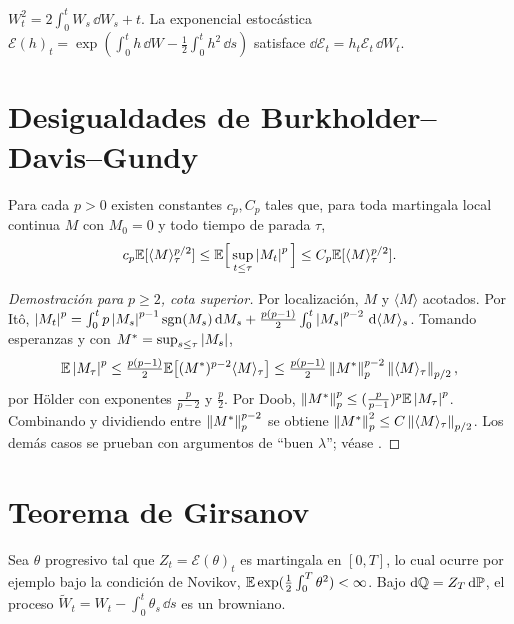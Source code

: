 \begin{ejemplo}
$W_t^2=2\int_0^tW_s\,\dd W_s+t$. La exponencial estocástica $\mathcal E(h)_t=\exp(\int_0^th\,\dd W-
\frac12\int_0^th^2\,\dd s)$ satisface $\dd\mathcal E_t=h_t\mathcal E_t\,\dd W_t$.
\end{ejemplo}

\section{Desigualdades de Burkholder--Davis--Gundy}

\begin{teorema}[BDG]\label{teo:bdg}
Para cada $p>0$ existen constantes $c_p,C_p$ tales que, para toda
martingala local continua $M$ con $M_0=0$ y todo tiempo de parada $\tau$,
\[
  c_p\mathbb{E}[\langle M\rangle_\tau^{p/2}]\le\mathbb{E}\Big[\sup_{t\le\tau}\left\lvert M_t\right\rvert^p\Big]\le C_p\mathbb{E}[\langle M\rangle_\tau^{p/2}].
\]
\end{teorema}

\begin{proof}[Demostración para $p\ge2$, cota superior]
Por localización, $M$ y $\langle M\rangle$ acotados. Por Itô,
$\left\lvert M_t\right\rvert^p=\int_0^tp\left\lvert M_s\right\rvert^{p-1}\operatorname{sgn}(M_s)\,\mathrm{d} M_s+\frac{p(p-1)}{2}\int_0^t\left\lvert M_s\right\rvert^{p-2}\,\mathrm{d}\langle M\rangle_s$. Tomando esperanzas y con
$M^*=\sup_{s\le\tau}\left\lvert M_s\right\rvert$,
\[
  \mathbb{E}\left\lvert M_\tau\right\rvert^p\le\tfrac{p(p-1)}{2}\mathbb{E}\big[(M^*)^{p-2}\langle M\rangle_\tau\big]\le\tfrac{p(p-1)}{2}\left\lVert M^*\right\rVert_p^{p-2}\left\lVert \langle M\rangle_\tau\right\rVert_{p/2},
\]
por Hölder con exponentes $\frac{p}{p-2}$ y $\frac p2$. Por Doob, $\left\lVert M^*\right\rVert_p^p\le(\frac{p}{p-1})^p\mathbb{E}\left\lvert M_\tau\right\rvert^p$. Combinando y
dividiendo entre $\left\lVert M^*\right\rVert_p^{p-2}$ se obtiene $\left\lVert M^*\right\rVert_p^2\le C\left\lVert \langle M\rangle_\tau\right\rVert_{p/2}$. Los demás casos se prueban con
argumentos de ``buen $\lambda$''; véase \cite[Th.~IV.4.1]{RevuzYor99}.
\end{proof}

\section{Teorema de Girsanov}

\begin{teorema}[Girsanov]\label{teo:girsanov}
Sea $\theta$ progresivo tal que $Z_t=\mathcal E(\theta)_t$ es martingala en $[0,T]$, lo cual
ocurre por ejemplo bajo la condición de Novikov, $\mathbb{E}\exp(\frac12\int_0^T\theta^2)<\infty$. Bajo $\mathrm{d}\mathbb{Q}=Z_T\,\mathrm{d}\mathbb{P}$, el
proceso $\tilde W_t=W_t-\int_0^t\theta_s\,\dd s$ es un browniano.
\end{teorema}

